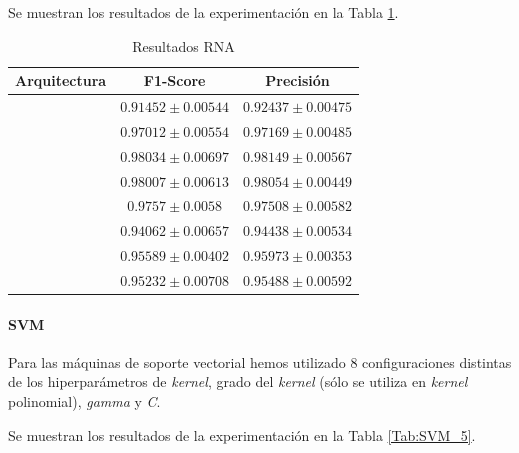\documentclass[12pt]{article}
\begin{document}
Se muestran los resultados de la experimentación en la Tabla \ref{Tab:ANN_5}.

\begin{table}[!ht]
	\caption{Resultados RNA}
	\centering
		\begin{tabular}{||c c c||}
			\hline
			Arquitectura & F1-Score & Precisión \\ [0.5ex]
			\hline\hline
			[16] & $0.91452 \pm 0.00544$ & $0.92437 \pm 0.00475$ \\
			\hline 
			[32] & $0.97012 \pm 0.00554$ & $0.97169 \pm 0.00485$ \\
			\hline 
			[64] & $0.98034 \pm 0.00697$ & $0.98149 \pm 0.00567$ \\
			\hline 
			[128] & $0.98007 \pm 0.00613$ & $0.98054 \pm 0.00449$ \\
			\hline 
			[256] & $0.9757 \pm 0.0058$ & $0.97508 \pm 0.00582$ \\
			\hline 
			[512] & $0.94062 \pm 0.00657$ & $0.94438 \pm 0.00534$ \\
			\hline 
			[64, 64] & $0.95589 \pm 0.00402$ & $0.95973 \pm 0.00353$ \\
			\hline 
			[64, 128] & $0.95232 \pm 0.00708$ & $0.95488 \pm 0.00592$ \\
			\hline 
		\end{tabular}
	\label{Tab:ANN_5}
	\end{table}

\paragraph{SVM}

Para las máquinas de soporte vectorial hemos utilizado 8 configuraciones distintas de los hiperparámetros de \textit{kernel},
grado del \textit{kernel} (sólo se utiliza en \textit{kernel} polinomial), \textit{gamma} y \textit{C}.

Se muestran los resultados de la experimentación en la Tabla \ref{Tab:SVM_5}.
\end{document}
